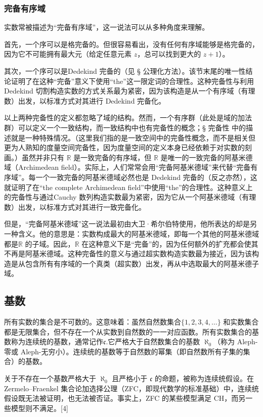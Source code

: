 \subsubsection{完备有序域}
实数常被描述为“完备有序域”，这一说法可以从多种角度来理解。

首先，一个序可以是格完备的。但很容易看出，没有任何有序域能够是格完备的，因为它不可能拥有最大元（给定任意元素 $z$，总可以找到更大的 $z+1$）。

其次，一个序可以是Dedekind 完备的（见 § 公理化方法）。该节末尾的唯一性结论证明了在这种“完备”意义下使用“the”这一限定词的合理性。这种完备性与利用 Dedekind 切割构造实数的方式关系最为紧密，因为该构造是从一个有序域（有理数）出发，以标准方式对其进行 Dedekind 完备化。

以上两种完备性的定义都忽略了域的结构。然而，一个有序群（此处是域的加法群）可以定义一个一致结构，而一致结构中也有完备性的概念；§ 完备性 中的描述就是一种特殊情况。（这里我们指的是一致空间中的完备性概念，而不是相关但更为人熟知的度量空间完备性，因为度量空间的定义本身已经依赖于对实数的刻画。）虽然并非只有 $\mathbb{R}$ 是一致完备的有序域，但 $\mathbb{R}$ 是唯一的一致完备的阿基米德域（Archimedean field）。实际上，人们常常会用“完备阿基米德域”来代替“完备有序域”。每一个一致完备的阿基米德域必然也是 Dedekind 完备的（反之亦然），这就证明了在“the complete Archimedean field”中使用“the”的合理性。这种意义上的完备性与通过Cauchy 数列构造实数最为紧密，因为它从一个阿基米德域（有理数）出发，以标准方式对其进行一致完备化。

但是，“完备阿基米德域”这一说法最初由大卫·希尔伯特使用，他所表达的却是另一种含义。他的意思是：实数构成最大的阿基米德域，即每一个其他的阿基米德域都是$\mathbb{R}$ 的子域。因此，$\mathbb{R}$ 在这种意义下是“完备”的，因为任何额外的扩充都会使其不再是阿基米德域。这种完备性的意义与通过超实数构造实数最为接近，因为该构造是从包含所有有序域的一个真类（超实数）出发，再从中选取最大的阿基米德子域。
\subsection{基数}
所有实数的集合是不可数的。这意味着：虽然自然数集合$\{1, 2, 3, 4, \ldots\}$ 和实数集合都是无限集合，但不存在一个从实数到自然数的一一对应函数。所有实数集合的基数称为连续统的基数，通常记作$\mathfrak{c}$.它严格大于自然数集合的基数 $\aleph_{0}$（称为 Aleph-零或 Aleph-无穷小）。连续统的基数等于自然数的幂集（即自然数所有子集的集合）的基数。

关于不存在一个基数严格大于 $\aleph_{0}$ 且严格小于 $\mathfrak{c}$ 的命题，被称为连续统假设。在 Zermelo–Fraenkel 集合论加选择公理（ZFC，即现代数学的标准基础）中，连续统假设既无法被证明，也无法被否证。事实上，ZFC 的某些模型满足 CH，而另一些模型则不满足。[4]
